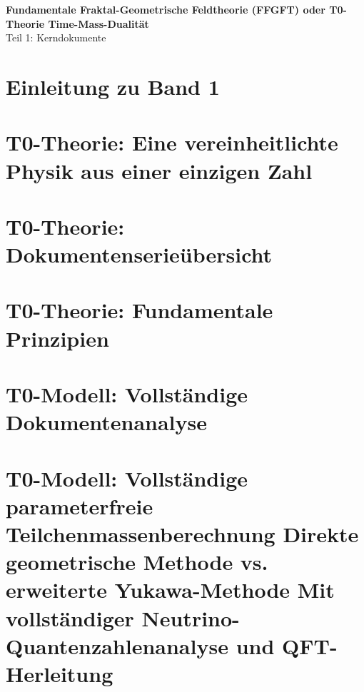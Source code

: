 
	
	
	\let\cleardoublepage\clearpage
	
	\setcounter{section}{0}
	\setcounter{subsection}{0}
	\setcounter{subsubsection}{0}
	\setcounter{paragraph}{0}
	
	\setcounter{secnumdepth}{1}  %
	\setcounter{tocdepth}{1}     %
	\begin{center}
		\vspace*{2cm}
		{\Huge\textbf{Fundamentale Fraktal-Geometrische Feldtheorie (FFGFT) oder T0-Theorie  Time-Mass-Dualität}}\\[1cm]
		{\Large Teil 1: Kerndokumente}\\[2cm]
	\end{center}
	
	\frontmatter
	\pagestyle{empty}
	
	\mainmatter
	\pagestyle{plain}
	
	\tableofcontents
	
	\chapter{Einleitung zu Band 1}
	
	
	
	\chapter{T0-Theorie: Eine vereinheitlichte Physik aus einer einzigen Zahl}
	
	\chapter{T0-Theorie: Dokumentenserieübersicht}
	
	\chapter{T0-Theorie: Fundamentale Prinzipien}
	
	\chapter{T0-Modell: Vollständige Dokumentenanalyse}
	
	\chapter{T0-Modell: Vollständige parameterfreie Teilchenmassenberechnung Direkte geometrische Methode vs. erweiterte Yukawa-Methode Mit vollständiger Neutrino-Quantenzahlenanalyse und QFT-Herleitung}
	

